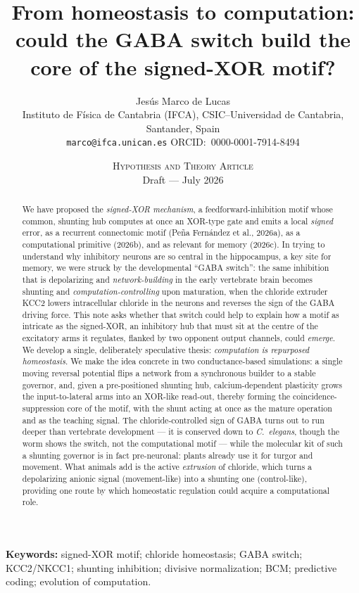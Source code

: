 \documentclass[11pt,a4paper]{article}
\title{\vspace{-1.6em}\textbf{From homeostasis to computation:\\[2pt]
could the GABA switch build the core of the signed-XOR motif?}}
\author{Jes\'us Marco de Lucas\\[2pt]
\small Instituto de F\'isica de Cantabria (IFCA), CSIC--Universidad de Cantabria, Santander, Spain\\
\small \texttt{marco@ifca.unican.es} \quad ORCID:~0000-0001-7914-8494}
\date{\small \textsc{Hypothesis and Theory Article} \\ Draft --- July 2026}
\begin{document}
\maketitle
\vspace{-1.4em}

\begin{abstract}\noindent
We have proposed the \emph{signed-XOR mechanism}, a feedforward-inhibition motif whose common, shunting hub computes at once an XOR-type gate and emits a local \emph{signed} error, as a recurrent connectomic motif (Pe\~na Fern\'andez et al., 2026a), as a computational primitive (2026b), and as relevant for memory (2026c). In trying to understand why inhibitory neurons are so central in the hippocampus, a key site for memory, we were struck by the developmental ``GABA switch'': the same inhibition that is depolarizing and \emph{network-building} in the early vertebrate brain becomes shunting and \emph{computation-controlling} upon maturation, when the chloride extruder KCC2 lowers intracellular chloride in the neurons and reverses the sign of the GABA driving force. This note asks whether that switch could help to explain how a motif as intricate as the signed-XOR, an inhibitory hub that must sit at the centre of the excitatory arms it regulates, flanked by two opponent output channels, could \emph{emerge}. We develop a single, deliberately speculative thesis: \emph{computation is repurposed homeostasis}. 
We make the idea concrete in two conductance-based simulations: a single moving reversal potential flips a network from a synchronous builder to a stable governor, and, given a pre-positioned shunting hub, calcium-dependent
plasticity grows the input-to-lateral arms into an XOR-like read-out, thereby forming the coincidence-suppression core of the motif, with the shunt acting at once as the mature operation and as the teaching signal.
The chloride-controlled sign of GABA turns out to run deeper than vertebrate development --- it is conserved down to \emph{C.~elegans}, though the worm shows the switch, not the computational motif --- while the molecular kit of such a shunting governor is in fact pre-neuronal: plants already use it for turgor and movement. What animals add is the active \emph{extrusion} of chloride, which turns a depolarizing anionic signal (movement-like) into a shunting one (control-like), providing one route by which homeostatic regulation could acquire a computational role.
\end{abstract}

\noindent\textbf{Keywords:} signed-XOR motif; chloride homeostasis; GABA switch; KCC2/NKCC1; shunting inhibition; divisive normalization; BCM; predictive coding; evolution of computation.
\end{document}
